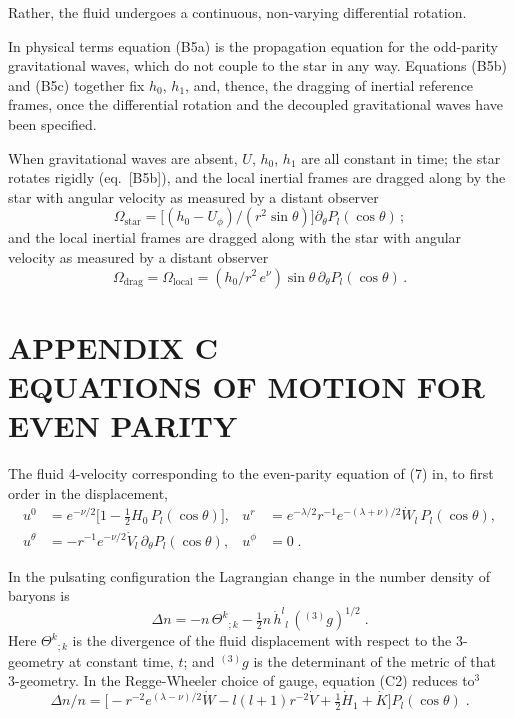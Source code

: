 \documentclass[12pt]{article}
\begin{document}
Rather, the fluid undergoes a continuous, non-varying differential rotation.

In physical terms equation (B5a) is the propagation equation for the odd-parity gravitational
waves, which do not couple to the star in any way. Equations (B5b) and (B5c) together fix $h_0$,
$h_1$, and, thence, the dragging of inertial reference frames, once the differential rotation and the
decoupled gravitational waves have been specified.

When gravitational waves are absent, $U$, $h_0$, $h_1$ are all constant in time; the star rotates
rigidly (eq.~[B5b]), and the local inertial frames are dragged along by the star with angular velocity
as measured by a distant observer
%
\begin{equation}
\Omega_\mathrm{star} = \bigl[(h_0 - U_\phi)/(r^2\sin\theta)\bigr]
    \partial_\theta P_l(\cos\theta) \,;
\tag{B7}
\end{equation}
%
and the local inertial frames are dragged along with the star with angular velocity as measured by
a distant observer
%
\begin{equation}
\Omega_\mathrm{drag} = \Omega_\mathrm{local} =
    (h_0/r^2\,e^\nu)\sin\theta\,\partial_\theta P_l(\cos\theta) \,.
\tag{B8}
\end{equation}

\section*{APPENDIX C \\ EQUATIONS OF MOTION FOR EVEN PARITY}

The fluid 4-velocity corresponding to the even-parity equation of (7) in, to
first order in the displacement,
\begin{align}
u^{0} &= e^{-\nu/2}\bigl[1 - \tfrac{1}{2}H_{0}\,P_{l}(\cos\theta)\bigr] , &
u^{r} &= e^{-\lambda/2} r^{-1} e^{-(\lambda+\nu)/2} \dot{W}_{l}\,P_{l}(\cos\theta) ,
\nonumber\\
u^{\theta} &= -r^{-1} e^{-\nu/2} \dot{V}_{l}\,\partial_{\theta}P_{l}(\cos\theta) , &
u^{\phi} &= 0 \;.
\tag{C1}
\end{align}

In the pulsating configuration the Lagrangian change in the number density of baryons is
\begin{equation}
\Delta n = -n\,\Theta^{k}{}_{;k} - \tfrac{1}{2}n\,\dot{h}^{l}{}_{l}\,({}^{(3)}g)^{1/2} \;.
\tag{C2}
\end{equation}
Here $\Theta^{k}{}_{;k}$ is the divergence of the fluid displacement with respect to the 3-geometry at constant
time, $t$; and ${}^{(3)}g$ is the determinant of the metric of that 3-geometry.  In the Regge-Wheeler
choice of gauge, equation (C2) reduces to$^{3}$
\begin{equation}
\Delta n/n = \bigl[-r^{-2}e^{(\lambda-\nu)/2}\dot{W} - l(l+1)r^{-2}\dot{V}
             + \tfrac{1}{2}\dot{H}_{1} + \dot{K}\bigr]P_{l}(\cos\theta) \;.
\tag{C3}
\end{equation}
\end{document}
